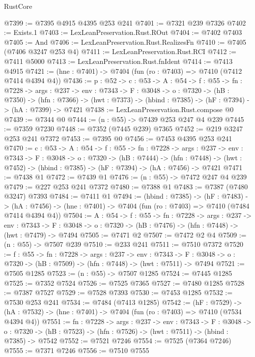 \begin{lexlean}{RustCore}
\begin{coremodule}
@7399 := @7395 @4915 @4395 @253 @241
@7401 := @7321 @239 @7326
@7402 := Exists.{1}
@7403 := LexLeanPreservation.Rust.ROut
@7404 := @7402 @7403
@7405 := And
@7406 := LexLeanPreservation.Rust.RealizesFn
@7410 := @7405 (@7406 @3247 @253 @4)
@7411 := LexLeanPreservation.Rust.RCI
@7412 := @7411 @5000
@7413 := LexLeanPreservation.Rust.fnIdent
@7414 := @7413 @4915
@7421 := (hne : @7401) -> @7404 (fun (ro : @7403) => @7410 (@7412 @7414 @4394 @4))
@7436 := {p : @52} ->
  {c : @53} ->
  {A : @54} ->
  {f : @55} ->
  {fn : @7228} ->
  {args : @237} ->
  {env : @7343} ->
  {F : @3048} ->
  {o : @7320} ->
  (hB : @7350) ->
  (hfn : @7366) -> (hwt : @7373) -> (hbind : @7385) -> (hF : @7394) -> (hA : @7399) -> @7421
@7438 := LexLeanPreservation.Rust.compose @0
@7439 := @7344 @0
@7444 := (n : @55) -> @7439 @253 @247 @4 @239
@7445 := @7359 @7230
@7448 := @7352 (@7445 @239) @7365
@7452 := @219 @3247 @253 @241 @7372
@7453 := @7395 @0
@7456 := @7453 @4395 @253 @241
@7470 := {c : @53} ->
  {A : @54} ->
  {f : @55} ->
  {fn : @7228} ->
  {args : @237} ->
  {env : @7343} ->
  {F : @3048} ->
  {o : @7320} ->
  (hB : @7444) ->
  (hfn : @7448) -> (hwt : @7452) -> (hbind : @7385) -> (hF : @7394) -> (hA : @7456) -> @7421
@7471 := @7438 @1
@7472 := @7439 @1
@7476 := (n : @55) -> @7472 @247 @4 @239
@7479 := @227 @253 @241 @7372
@7480 := @7388 @1
@7483 := @7387 (@7480 @3247) @7393
@7484 := @7411 @1
@7494 := (hbind : @7385) ->
  (hF : @7483) ->
  (hA : @7456) -> (hne : @7401) -> @7404 (fun (ro : @7403) => @7410 (@7484 @7414 @4394 @4))
@7504 := {A : @54} ->
  {f : @55} ->
  {fn : @7228} ->
  {args : @237} ->
  {env : @7343} ->
  {F : @3048} -> {o : @7320} -> (hB : @7476) -> (hfn : @7448) -> (hwt : @7479) -> @7494
@7505 := @7471 @2
@7507 := @7472 @2 @4
@7509 := (n : @55) -> @7507 @239
@7510 := @233 @241
@7511 := @7510 @7372
@7520 := {f : @55} ->
  {fn : @7228} ->
  {args : @237} ->
  {env : @7343} ->
  {F : @3048} -> {o : @7320} -> (hB : @7509) -> (hfn : @7448) -> (hwt : @7511) -> @7494
@7521 := @7505 @1285
@7523 := (n : @55) -> @7507 @1285
@7524 := @7445 @1285
@7525 := @7352 @7524
@7526 := @7525 @7365
@7527 := @7480 @1285
@7528 := @7387 @7527
@7529 := @7528 @7393
@7530 := @7453 @1285
@7532 := @7530 @253 @241
@7534 := @7484 (@7413 @1285)
@7542 := (hF : @7529) ->
  (hA : @7532) -> (hne : @7401) -> @7404 (fun (ro : @7403) => @7410 (@7534 @4394 @4))
@7551 := {fn : @7228} ->
  {args : @237} ->
  {env : @7343} ->
  {F : @3048} ->
  {o : @7320} -> (hB : @7523) -> (hfn : @7526) -> (hwt : @7511) -> (hbind : @7385) -> @7542
@7552 := @7521 @7246
@7554 := @7525 (@7364 @7246)
@7555 := @7371 @7246
@7556 := @7510 @7555

\end{coremodule}
\end{lexlean}
